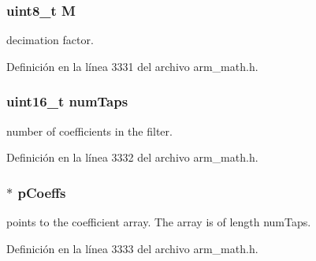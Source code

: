 \subsubsection[{\texorpdfstring{M}{M}}]{\setlength{\rightskip}{0pt plus 5cm}uint8\+\_\+t M}\hypertarget{structarm__fir__decimate__instance__q31_ae2c8107d00d3c9942e7a20fc598edecf}{}\label{structarm__fir__decimate__instance__q31_ae2c8107d00d3c9942e7a20fc598edecf}
decimation factor. 

Definición en la línea 3331 del archivo arm\+\_\+math.\+h.

\subsubsection[{\texorpdfstring{num\+Taps}{numTaps}}]{\setlength{\rightskip}{0pt plus 5cm}uint16\+\_\+t num\+Taps}\hypertarget{structarm__fir__decimate__instance__q31_a751941891e47f522a7f5375fe8990aac}{}\label{structarm__fir__decimate__instance__q31_a751941891e47f522a7f5375fe8990aac}
number of coefficients in the filter. 

Definición en la línea 3332 del archivo arm\+\_\+math.\+h.

\subsubsection[{\texorpdfstring{p\+Coeffs}{pCoeffs}}]{$\ast$ p\+Coeffs}\hypertarget{structarm__fir__decimate__instance__q31_a68888e36167d81cb7836db10367a1682}{}\label{structarm__fir__decimate__instance__q31_a68888e36167d81cb7836db10367a1682}
points to the coefficient array. The array is of length num\+Taps. 

Definición en la línea 3333 del archivo arm\+\_\+math.\+h.

